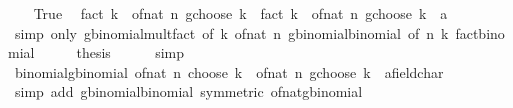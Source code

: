 \begin{isabellebody}
\ \ \isamarkupfalse%
\ True\ \isamarkupfalse%
\ {\isachardoublequoteopen}fact\ k\ {\isacharasterisk}{\kern0pt}\ of{\isacharunderscore}{\kern0pt}nat\ {\isacharparenleft}{\kern0pt}n\ gchoose\ k{\isacharparenright}{\kern0pt}\ {\isacharequal}{\kern0pt}\ {\isacharparenleft}{\kern0pt}fact\ k\ {\isacharasterisk}{\kern0pt}\ {\isacharparenleft}{\kern0pt}of{\isacharunderscore}{\kern0pt}nat\ n\ gchoose\ k{\isacharparenright}{\kern0pt}\ {\isacharcolon}{\kern0pt}{\isacharcolon}{\kern0pt}\ {\isacharprime}{\kern0pt}a{\isacharparenright}{\kern0pt}{\isachardoublequoteclose}\isanewline
\ \ \ \ \isamarkupfalse%
\ {\isacharparenleft}{\kern0pt}simp\ only{\isacharcolon}{\kern0pt}\ gbinomial{\isacharunderscore}{\kern0pt}mult{\isacharunderscore}{\kern0pt}fact\ {\isacharbrackleft}{\kern0pt}of\ k\ {\isachardoublequoteopen}of{\isacharunderscore}{\kern0pt}nat\ n{\isachardoublequoteclose}{\isacharbrackright}{\kern0pt}\ gbinomial{\isacharunderscore}{\kern0pt}binomial\ {\isacharbrackleft}{\kern0pt}of\ n\ k{\isacharbrackright}{\kern0pt}\ fact{\isacharunderscore}{\kern0pt}binomial{\isacharparenright}{\kern0pt}\isanewline
\ \ \isamarkupfalse%
\ \isamarkupfalse%
\ {\isacharquery}{\kern0pt}thesis\isanewline
\ \ \ \ \isamarkupfalse%
\ simp\isanewline
{}\isamarkupfalse%
%
\endisatagproof
{\isafoldproof}%
%
\isadelimproof
\isanewline
%
\endisadelimproof
\isanewline
{}\isamarkupfalse%
\ binomial{\isacharunderscore}{\kern0pt}gbinomial{\isacharcolon}{\kern0pt}\ {\isachardoublequoteopen}of{\isacharunderscore}{\kern0pt}nat\ {\isacharparenleft}{\kern0pt}n\ choose\ k{\isacharparenright}{\kern0pt}\ {\isacharequal}{\kern0pt}\ {\isacharparenleft}{\kern0pt}of{\isacharunderscore}{\kern0pt}nat\ n\ gchoose\ k\ {\isacharcolon}{\kern0pt}{\isacharcolon}{\kern0pt}\ {\isacharprime}{\kern0pt}a{\isacharcolon}{\kern0pt}{\isacharcolon}{\kern0pt}field{\isacharunderscore}{\kern0pt}char{\isacharunderscore}{\kern0pt}{}{\isacharparenright}{\kern0pt}{\isachardoublequoteclose}\isanewline
%
\isadelimproof
\ \ %
\endisadelimproof
%
\isatagproof
{}\isamarkupfalse%
\ {\isacharparenleft}{\kern0pt}simp\ add{\isacharcolon}{\kern0pt}\ gbinomial{\isacharunderscore}{\kern0pt}binomial\ {\isacharbrackleft}{\kern0pt}symmetric{\isacharbrackright}{\kern0pt}\ of{\isacharunderscore}{\kern0pt}nat{\isacharunderscore}{\kern0pt}gbinomial{\isacharparenright}{\kern0pt}%
\endisatagproof
{\isafoldproof}%
%
\isadelimproof
\isanewline
%
\endisadelimproof
%
\isadelimML
\isanewline
%
\endisadelimML
%

\end{isabellebody}
